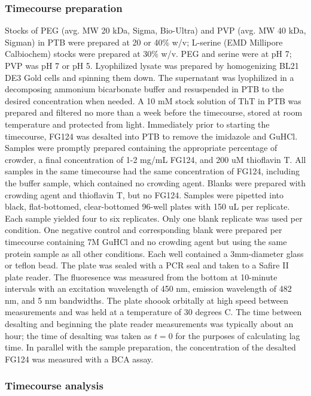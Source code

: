 \subsubsection{Timecourse preparation} Stocks of PEG (avg. MW 20 kDa, Sigma, Bio-Ultra) and PVP (avg. MW 40 kDa, Sigman) in PTB were prepared at 20 or 40\% w/v; L-serine (EMD Millipore Calbiochem) stocks were prepared at 30\% w/v.  PEG and serine were at pH 7; PVP was pH 7 or pH 5.  Lyophilized lysate was prepared by homogenizing BL21 DE3 Gold cells and spinning them down.  The supernatant was lyophilized in a decomposing ammonium bicarbonate buffer and resuspended in PTB to the desired concentration when needed.  A 10 mM stock solution of ThT in PTB was prepared and filtered no more than a week before the timecourse, stored at room temperature and protected from light.  Immediately prior to starting the timecourse, FG124 was desalted into PTB to remove the imidazole and GuHCl.  Samples were promptly prepared containing the appropriate percentage of crowder, a final concentration of 1-2 mg/mL FG124, and 200 uM thioflavin T.  All samples in the same timecourse had the same concentration of FG124, including the buffer sample, which contained no crowding agent.  Blanks were prepared with crowding agent and thioflavin T, but no FG124.  Samples were pipetted into black, flat-bottomed, clear-bottomed 96-well plates with 150 uL per replicate.  Each sample yielded four to six replicates.  Only one blank replicate was used per condition.  One negative control and corresponding blank were prepared per timecourse containing 7M GuHCl and no crowding agent but using the same protein sample as all other conditions.  Each well contained a 3mm-diameter glass or teflon bead.  The plate was sealed with a PCR seal and taken to a Safire II plate reader.  The fluoresence was measured from the bottom at 10-minute intervals with an excitation wavelength of 450 nm, emission wavelength of 482 nm, and 5 nm bandwidths.  The plate shoook orbitally at high speed between measurements and was held at a temperature of 30 degrees C.  The time between desalting and beginning the plate reader measurements was typically about an hour; the time of desalting was taken as $t=0$ for the purposes of calculating lag time. In parallel with the sample preparation, the concentration of the desalted FG124 was measured with a BCA assay.

\subsubsection{Timecourse analysis}


